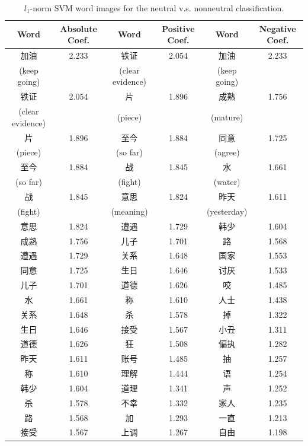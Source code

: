 \documentclass[11pt]{article}
\newcommand{\1}[1]{{\mathbf 1}\left\{#1\right\}}        %
\begin{document}
\begin{table}[!h]
\caption{$l_1$-norm SVM word images for the neutral v.s. nonneutral classification.}
\begin{center}
\begin{tabular}{|c|c||c|c||c|c|}
\hline
Word & Absolute Coef. & Word & Positive Coef. & Word & Negative Coef.\\ \hline\hline
加油 & 2.233 & 铁证 & 2.054 & 加油 & 2.233\\
(keep going) & & (clear evidence) & & (keep going) & \\\hline
铁证 & 2.054 & 片 & 1.896 & 成熟 & 1.756\\
(clear evidence) & & (piece) & & (mature) & \\\hline
片 & 1.896 & 至今 & 1.884 & 同意 & 1.725\\
(piece) & & (so far) & & (agree) & \\\hline
至今 & 1.884 & 战 & 1.845 & 水 & 1.661\\
(so far) & & (fight) & & (water) & \\\hline
战 & 1.845 & 意思 & 1.824 & 昨天 & 1.611\\
(fight) & & (meaning) & & (yesterday) & \\\hline
意思 & 1.824 & 遭遇 & 1.729 & 韩少 & 1.604\\ \hline
成熟 & 1.756 & 儿子 & 1.701 & 路 & 1.568\\ \hline
遭遇 & 1.729 & 关系 & 1.648 & 国家 & 1.553\\ \hline
同意 & 1.725 & 生日 & 1.646 & 讨厌 & 1.533\\ \hline
儿子 & 1.701 & 道德 & 1.626 & 咬 & 1.485\\ \hline
水 & 1.661 & 称 & 1.610 & 人士 & 1.438\\ \hline
关系 & 1.648 & 杀 & 1.578 & 掉 & 1.322\\ \hline
生日 & 1.646 & 接受 & 1.567 & 小丑 & 1.311\\ \hline
道德 & 1.626 & 狂 & 1.508 & 偏执 & 1.282\\ \hline
昨天 & 1.611 & 账号 & 1.485 & 抽 & 1.257\\ \hline
称 & 1.610 & 理解 & 1.444 & 语 & 1.254\\ \hline
韩少 & 1.604 & 道理 & 1.341 & 声 & 1.252\\ \hline
杀 & 1.578 & 不幸 & 1.332 & 家人 & 1.235\\ \hline
路 & 1.568 & 加 & 1.293 & 一直 & 1.213\\ \hline
接受 & 1.567 & 上调 & 1.267 & 自由 & 1.198\\ \hline
\end{tabular}
\label{tb:svmfullneu}
\end{center}
\end{table}
\end{document}
